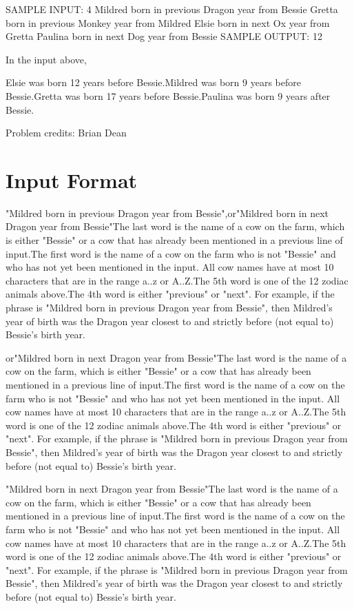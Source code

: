 \documentclass[12pt]{article}
\begin{document}
SAMPLE INPUT:
4
Mildred born in previous Dragon year from Bessie
Gretta born in previous Monkey year from Mildred
Elsie born in next Ox year from Gretta
Paulina born in next Dog year from Bessie
SAMPLE OUTPUT: 
12

In the input above,

Elsie was born 12 years before Bessie.Mildred was born 9 years
before Bessie.Gretta was born 17 years before Bessie.Paulina
was born 9 years after Bessie.

Problem credits: Brian Dean



\section*{Input Format}
"Mildred born in previous Dragon year from Bessie",or"Mildred born in next Dragon year from Bessie"The last word is the name of a cow on the farm, which is either "Bessie" or a
cow that has already been mentioned in a previous line of input.The first word is the name of a cow on the farm who is not "Bessie" and who  has
not yet been mentioned  in the input.  All cow names have at most 10 characters
that are in the range a..z or A..Z.The 5th word is one of the 12 zodiac animals above.The 4th word is either "previous" or "next".  For example, if the phrase is
"Mildred born in previous Dragon year from Bessie", then Mildred's year of 
birth was the Dragon year closest to and strictly before (not equal to) 
Bessie's birth year.

or"Mildred born in next Dragon year from Bessie"The last word is the name of a cow on the farm, which is either "Bessie" or a
cow that has already been mentioned in a previous line of input.The first word is the name of a cow on the farm who is not "Bessie" and who  has
not yet been mentioned  in the input.  All cow names have at most 10 characters
that are in the range a..z or A..Z.The 5th word is one of the 12 zodiac animals above.The 4th word is either "previous" or "next".  For example, if the phrase is
"Mildred born in previous Dragon year from Bessie", then Mildred's year of 
birth was the Dragon year closest to and strictly before (not equal to) 
Bessie's birth year.

"Mildred born in next Dragon year from Bessie"The last word is the name of a cow on the farm, which is either "Bessie" or a
cow that has already been mentioned in a previous line of input.The first word is the name of a cow on the farm who is not "Bessie" and who  has
not yet been mentioned  in the input.  All cow names have at most 10 characters
that are in the range a..z or A..Z.The 5th word is one of the 12 zodiac animals above.The 4th word is either "previous" or "next".  For example, if the phrase is
"Mildred born in previous Dragon year from Bessie", then Mildred's year of 
birth was the Dragon year closest to and strictly before (not equal to) 
Bessie's birth year.
\end{document}
